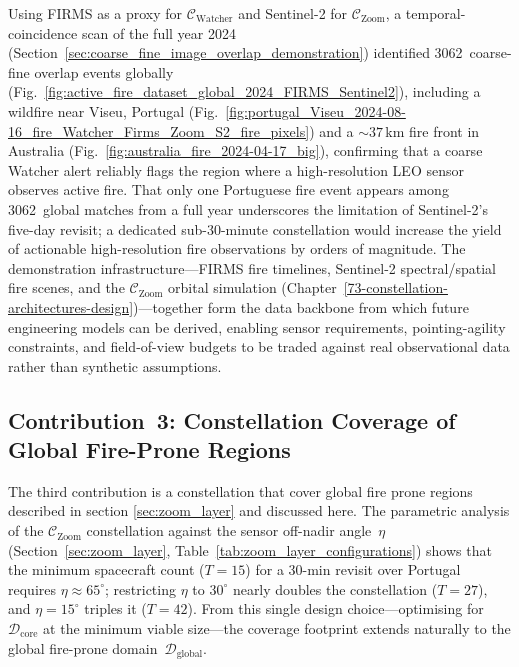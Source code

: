 Using FIRMS as a proxy for $\mathcal{C}_{\text{Watcher}}$ and Sentinel-2 for $\mathcal{C}_{\text{Zoom}}$, a temporal-coincidence scan of the full year 2024 (Section~\ref{sec:coarse_fine_image_overlap_demonstration}) identified 3062~coarse-fine overlap events globally (Fig.~\ref{fig:active_fire_dataset_global_2024_FIRMS_Sentinel2}), including a wildfire near Viseu, Portugal (Fig.~\ref{fig:portugal_Viseu_2024-08-16_fire_Watcher_Firms_Zoom_S2_fire_pixels}) and a $\sim\!37$\,km fire front in Australia (Fig.~\ref{fig:australia_fire_2024-04-17_big}), confirming that a coarse Watcher alert reliably flags the region where a high-resolution LEO sensor observes active fire.  That only one Portuguese fire event appears among 3062~global matches from a full year underscores the limitation of Sentinel-2's five-day revisit; a dedicated sub-30-minute constellation would increase the yield of actionable high-resolution fire observations by orders of magnitude.  The demonstration infrastructure---FIRMS fire timelines, Sentinel-2 spectral/spatial fire scenes, and the $\mathcal{C}_{\text{Zoom}}$ orbital simulation (Chapter~\ref{73-constellation-architectures-design})---together form the data backbone from which future engineering models can be derived, enabling sensor requirements, pointing-agility constraints, and field-of-view budgets to be traded against real observational data rather than synthetic assumptions.

\subsection{Contribution~3: Constellation Coverage of Global Fire-Prone Regions}

The third contribution is a constellation that cover global fire prone regions described in section \ref{sec:zoom_layer} and discussed here. The parametric analysis of the $\mathcal{C}_{\text{Zoom}}$ constellation against the sensor off-nadir angle~$\eta$ (Section~\ref{sec:zoom_layer}, Table~\ref{tab:zoom_layer_configurations}) shows that the minimum spacecraft count ($T = 15$) for a 30-min revisit over Portugal requires $\eta \approx 65^{\circ}$; restricting $\eta$ to $30^{\circ}$ nearly doubles the constellation ($T = 27$), and $\eta = 15^{\circ}$ triples it ($T = 42$).  From this single design choice---optimising for $\mathcal{D}_{\mathrm{core}}$ at the minimum viable size---the coverage footprint extends naturally to the global fire-prone domain~$\mathcal{D}_{\mathrm{global}}$.

